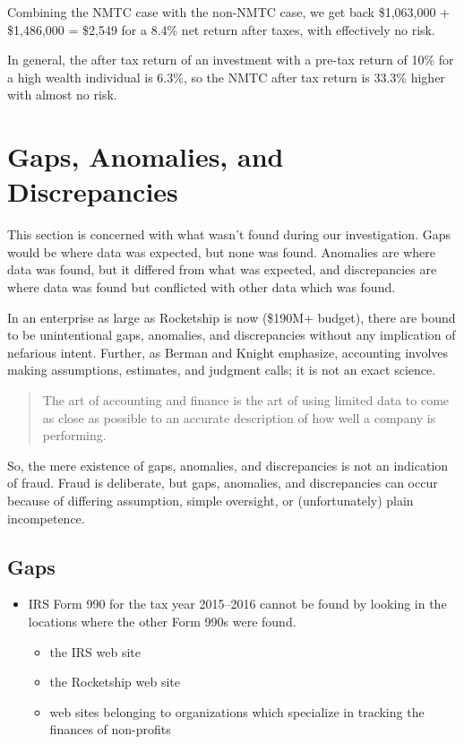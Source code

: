 Combining the NMTC case with the non-NMTC case, we get back \$1,063,000 + \$1,486,000 = \$2,549 for a 8.4\% net return after taxes, with effectively no risk.
  
  In general, the after tax return of an investment with a pre-tax return of 10\% for a high wealth individual is 6.3\%, so the NMTC after tax return is 33.3\% higher with almost no risk.

\section{Gaps,  Anomalies, and Discrepancies}\indent%
\label{sec:gaps_anomolies_discrepencies}

This section is concerned with what wasn't found during our investigation. Gaps would be where data was expected, but none was found. Anomalies are where data was found, but it differed from what was expected, and discrepancies are where data was found but conflicted with other data which was found.

In an enterprise as large as Rocketship is now (\$190M+ budget), there are bound to be unintentional gaps, anomalies, and discrepancies without any implication of nefarious intent. Further, as Berman and Knight emphasize, accounting involves making assumptions, estimates, and judgment calls; it is not an exact science.
\begin{quotation}
  The art of accounting and finance is the art of using limited data to come as close as possible to an accurate description of how well a company is performing.
\end{quotation}

So, the mere existence of gaps, anomalies, and discrepancies is not an indication of fraud. Fraud is deliberate, but gaps, anomalies, and discrepancies can occur because of differing assumption, simple oversight, or (unfortunately) plain incompetence.

\subsection{Gaps}\indent%
\label{sec:gaps}

\begin{itemize}
  \item IRS Form 990 for the tax year 2015–2016 cannot be found by looking in the locations where the other Form 990s were found.
  \begin{itemize}
    \item the IRS web site
    \item the Rocketship web site
    \item web sites belonging to organizations which specialize in tracking the finances of non-profits
  \end{itemize}
\end{itemize}

